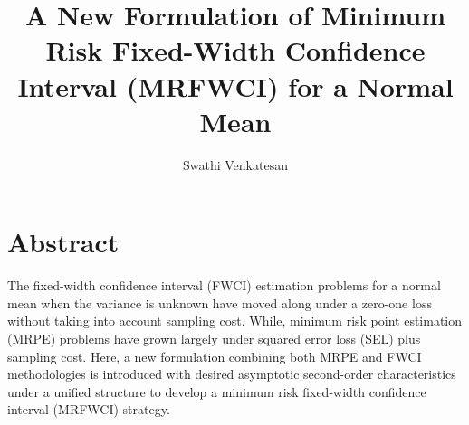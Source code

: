 \documentclass[12pt]{article}
\title{A New Formulation of Minimum Risk Fixed-Width Confidence Interval (MRFWCI) for a Normal Mean}
\author{Swathi Venkatesan}
\date{}
\begin{document}
\maketitle
\section*{Abstract}
The fixed-width confidence interval (FWCI) estimation problems for a normal mean when the variance is unknown have moved along under a zero-one loss without taking into account sampling cost. While, minimum risk point estimation (MRPE) problems have grown largely under squared error loss (SEL) plus sampling cost. Here, a new formulation combining
both MRPE and FWCI methodologies is introduced with desired asymptotic second-order characteristics under a unified structure to develop a minimum risk fixed-width confidence interval (MRFWCI) strategy.
\end{document}
